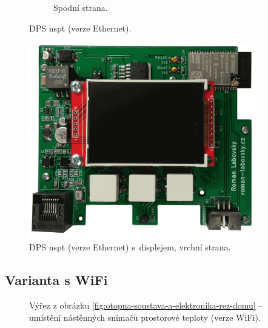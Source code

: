 \begin{figure}[H]
\begin{subfigure}{.5\textwidth}
  \caption{Spodní strana.}
  \label{fig:dps-nastenny-snimac-prostorove-teploty-ethernet-spodni-cast}
\end{subfigure}
\caption{DPS \acrshort{nspt} (verze Ethernet).}
\label{fig:dps-nastenny-snimac-prostorove-teploty-ethernet}
\end{figure}


\begin{figure}[H]
    \centering
    \includegraphics[width=0.88\textwidth]{images/nastenny-snimac-prostorove-teploty-ethernet/dps-nastenny-snimac-prostorove-teploty-ethernet-vrchni-cast-displej.png}
    \caption{DPS \acrshort{nspt} (verze Ethernet) s~displejem, vrchní strana.}
    \label{fig:dps-nastenny-snimac-prostorove-teploty-ethernet-vrchni-cast-displej}
\end{figure}



\subsection{Varianta s WiFi}
\label{sec:wifi-modul}


\begin{figure}[H]
   \centering
   \def\svgwidth{0.5\columnwidth}
   
    \caption[Výřez umístění nástěnných snímačů prostorové teploty (verze WiFi).]{Výřez z obrázku \ref{fig:otopna-soustava-a-elektronika-rez-domu} – umístění nástěnných snímačů prostorové teploty (verze WiFi).}
    \label{fig:vyrez-nastenny-snimac-prostorove-teploty-wifi}
\end{figure}

